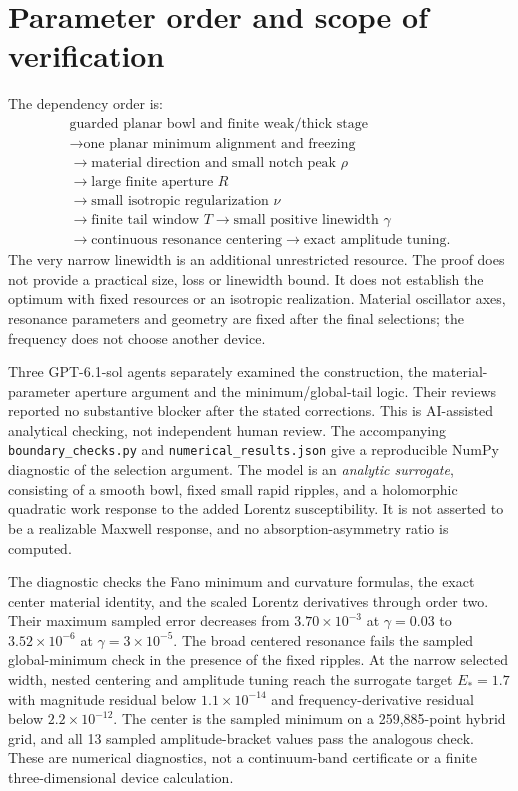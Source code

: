\documentclass[11pt]{article}
\begin{document}
\section{Parameter order and scope of verification}
The dependency order is:
\[
 \begin{gathered}
 \text{guarded planar bowl and finite weak/thick stage}\\
 \longrightarrow\text{one planar minimum alignment and freezing}\\
 \longrightarrow\text{material direction and small notch peak }\rho\\
 \longrightarrow\text{large finite aperture }R\\
 \longrightarrow\text{small isotropic regularization }\nu\\
 \longrightarrow\text{finite tail window }T
 \longrightarrow\text{small positive linewidth }\gamma\\
 \longrightarrow\text{continuous resonance centering}
 \longrightarrow\text{exact amplitude tuning}.
 \end{gathered}
\]
The very narrow linewidth is an additional unrestricted resource.
The proof does not provide a practical size, loss or linewidth bound.
It does not establish the optimum with fixed resources or an isotropic
realization. Material oscillator axes, resonance parameters and geometry are
fixed after the final selections; the frequency does not choose another device.

Three GPT-6.1-sol agents separately examined the construction, the
material-parameter aperture argument and the minimum/global-tail logic.
Their reviews reported no substantive blocker after the stated corrections.
This is AI-assisted analytical checking, not independent human review.
The accompanying \texttt{boundary\_checks.py} and
\texttt{numerical\_results.json} give a reproducible NumPy diagnostic of the
selection argument. The model is an \emph{analytic surrogate}, consisting of
a smooth bowl, fixed small rapid ripples, and a holomorphic quadratic work
response to the added Lorentz susceptibility. It is not asserted to be a
realizable Maxwell response, and no absorption-asymmetry ratio is computed.

The diagnostic checks the Fano minimum and curvature formulas, the exact
center material identity, and the scaled Lorentz derivatives through order
two. Their maximum sampled error decreases from $3.70\times10^{-3}$ at
$\gamma=0.03$ to $3.52\times10^{-6}$ at $\gamma=3\times10^{-5}$.
The broad centered resonance fails the sampled global-minimum check in the
presence of the fixed ripples. At the narrow selected width, nested centering
and amplitude tuning reach the surrogate target $E_*=1.7$ with magnitude
residual below $1.1\times10^{-14}$ and frequency-derivative residual below
$2.2\times10^{-12}$. The center is the sampled minimum on a 259,885-point
hybrid grid, and all 13 sampled amplitude-bracket values pass the analogous
check. These are numerical diagnostics, not a continuum-band certificate or
a finite three-dimensional device calculation.
\end{document}
